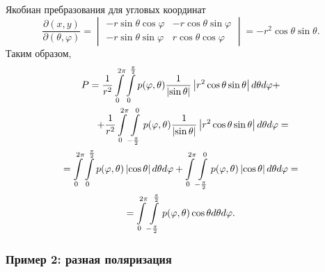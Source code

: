 Якобиан пребразования для угловых координат
\[
    \frac{\partial (x, y)}{\partial (\theta, \varphi)}
    = \begin{vmatrix}
        - r \sin \theta \cos \varphi & - r \cos \theta \sin \varphi \\
        - r \sin \theta \sin \varphi & r \cos \theta \cos \varphi
    \end{vmatrix}
    = - r^2 \cos \theta \sin \theta .
\]
Таким образом,
\begin{multline*}
    P = \frac{1}{r^2} \int \limits_0^{2 \pi} \int \limits_0^\frac{\pi}{2} p(\varphi, \theta) \frac{1}{\modulus{\sin \theta}} \modulus{r^2 \cos \theta \sin \theta} d\theta d\varphi + \\
    \shoveright{+ \frac{1}{r^2} \int \limits_0^{2 \pi} \int \limits_{-\frac{\pi}{2}}^0 p(\varphi, \theta) \frac{1}{\modulus{\sin \theta}} \modulus{r^2 \cos \theta \sin \theta} d\theta d\varphi = } \\
    = \int \limits_0^{2 \pi} \int \limits_0^\frac{\pi}{2} p(\varphi, \theta) \modulus{\cos \theta} d\theta d\varphi
    + \int \limits_0^{2 \pi} \int \limits_{-\frac{\pi}{2}}^0 p(\varphi, \theta) \modulus{\cos \theta} d\theta d\varphi = \\
    = \int \limits_0^{2 \pi} \int \limits_{-\frac{\pi}{2}}^\frac{\pi}{2} p(\varphi, \theta) \cos \theta d\theta d\varphi .
\end{multline*}

\subsubsection{Пример 2: разная поляризация}

